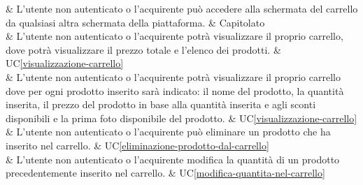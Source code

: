  & L'utente non autenticato o l'acquirente può accedere alla schermata del carrello da qualsiasi altra schermata della piattaforma. & Capitolato \\

 & L'utente non autenticato o l'acquirente potrà visualizzare il proprio carrello, dove potrà visualizzare il prezzo totale e l'elenco dei prodotti. & UC\ref{visualizzazione-carrello} \\

 & L'utente non autenticato o l'acquirente potrà visualizzare il proprio carrello dove per ogni prodotto inserito sarà indicato: il nome del prodotto, la quantità inserita, il prezzo del prodotto in base alla quantità inserita e agli sconti disponibili e la prima foto disponibile del prodotto. & UC\ref{visualizzazione-carrello} \\

 & L'utente non autenticato o l'acquirente può eliminare un prodotto che ha inserito nel carrello. & UC\ref{eliminazione-prodotto-dal-carrello} \\

 & L'utente non autenticato o l'acquirente modifica la quantità di un prodotto precedentemente inserito nel carrello. & UC\ref{modifica-quantita-nel-carrello} \\

